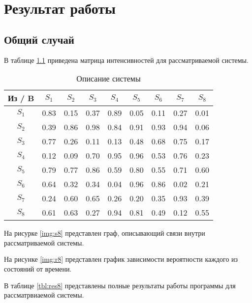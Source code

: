 \chapter{Результат работы}

\section{Общий случай}

В таблице \ref{tbl:system8} приведена матрица интенсивностей для рассматриваемой системы.

\begin{table}[ht]
	\begin{center}
		\caption{Описание системы}
		\label{tbl:system8}
		\begin{tabular}{|c|c|c|c|c|c|c|c|c|}
			\hline
			Из / B & $S_1$ & $S_2$ & $S_3$ & $S_4$ & $S_5$ & $S_6$ & $S_7$ & $S_8$ \\\hline
			$S_1$ & 0.83 & 0.15 & 0.37 & 0.89 & 0.05 & 0.11 & 0.27 & 0.01 \\\hline
			$S_2$ & 0.39 & 0.86 & 0.98 & 0.84 & 0.91 & 0.93 & 0.94 & 0.06 \\\hline
			$S_3$ & 0.77 & 0.26 & 0.11 & 0.13 & 0.48 & 0.68 & 0.75 & 0.17 \\\hline
			$S_4$ & 0.12 & 0.09 & 0.70 & 0.95 & 0.96 & 0.53 & 0.76 & 0.23 \\\hline
			$S_5$ & 0.79 & 0.77 & 0.86 & 0.59 & 0.80 & 0.55 & 0.71 & 0.60 \\\hline
			$S_6$ & 0.64 & 0.32 & 0.34 & 0.04 & 0.96 & 0.86 & 0.02 & 0.21 \\\hline
			$S_7$ & 0.24 & 0.60 & 0.65 & 0.26 & 0.20 & 0.35 & 0.93 & 0.39 \\\hline
			$S_8$ & 0.61 & 0.63 & 0.27 & 0.94 & 0.81 & 0.49 & 0.12 & 0.55 \\\hline
		\end{tabular}
	\end{center}
\end{table}

На рисурке \ref{img:s8} представлен граф, описывающий связи внутри рассматриваемой системы.


На рисунке \ref{img:r8} представлен график зависимости вероятности каждого из состояний от времени.


В таблице \ref{tbl:res8} представлены полные результаты работы программы для рассматрвиаемой системы.

